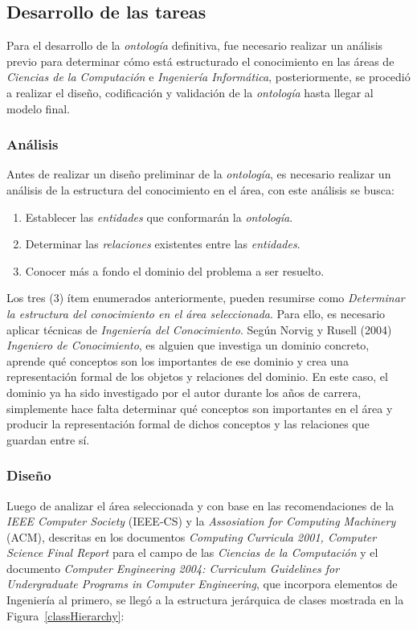 \begin{itemize}
\subsection{Desarrollo de las tareas}
Para el desarrollo de la \textit{ontología} definitiva, fue necesario realizar un análisis previo para determinar cómo está estructurado el conocimiento en las áreas de \textit{Ciencias de la Computación} e \textit{Ingeniería Informática}, posteriormente, se procedió a realizar el diseño, codificación y validación de la \textit{ontología} hasta llegar al modelo final.

\subsubsection{Análisis}
Antes de realizar un diseño preliminar de la \textit{ontología}, es necesario realizar un análisis de la estructura del conocimiento en el área, con este análisis se busca:

\begin{enumerate}
    \item Establecer las \textit{entidades} que conformarán la \textit{ontología}.
    \item Determinar las \textit{relaciones} existentes entre las \textit{entidades}.
    \item Conocer más a fondo el dominio del problema a ser resuelto.
\end{enumerate}

Los tres (3) ítem enumerados anteriormente, pueden resumirse como \textit{Determinar la estructura del conocimiento en el área seleccionada}. Para ello, es necesario aplicar técnicas de \textit{Ingeniería del Conocimiento}. Según Norvig y Rusell (2004) \textit{Ingeniero de Conocimiento}, es alguien que investiga un dominio concreto, aprende qué conceptos son los importantes de ese dominio y crea una representación formal de los objetos y relaciones del dominio. En este caso, el dominio ya ha sido investigado por el autor durante los años de carrera, simplemente hace falta determinar qué conceptos son importantes en el área y producir la representación formal de dichos conceptos y las relaciones que guardan entre sí.

\subsubsection{Diseño}
Luego de analizar el área seleccionada y con base en las recomendaciones de la \textit{IEEE Computer Society} (IEEE-CS) y la \textit{Assosiation for Computing Machinery} (ACM), descritas en los documentos \textit{Computing Curricula 2001, Computer Science Final Report} para el campo de las \textit{Ciencias de la Computación} y el documento \textit{Computer Engineering 2004: Curriculum Guidelines for Undergraduate Programs in Computer Engineering}, que incorpora elementos de Ingeniería al primero, se llegó a la estructura jerárquica de clases mostrada en la Figura~\ref{classHierarchy}:



\end{itemize}
